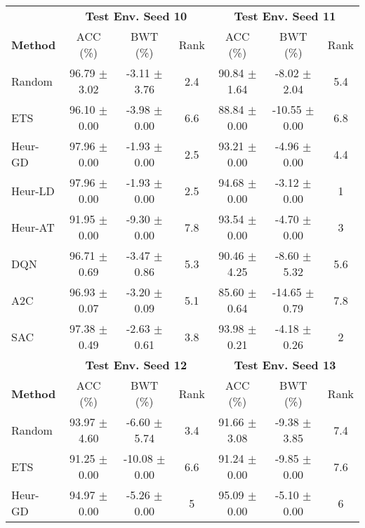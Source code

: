 \begin{tabular}{lcccccc}
	\toprule 
	& \multicolumn{3}{c}{\textbf{Test Env. Seed 10}} & \multicolumn{3}{c}{\textbf{Test Env. Seed 11}} \\
	\cmidrule(lr){2-4} \cmidrule(lr){5-7}
	\textbf{Method} & ACC (\%)          & BWT (\%)          & Rank   & ACC (\%)          & BWT (\%)          & Rank   \\
	\midrule 
	Random          & 96.79 $\pm$ 3.02    & -3.11 $\pm$ 3.76    & 2.4    & 90.84 $\pm$ 1.64    & -8.02 $\pm$ 2.04    & 5.4    \\
	ETS             & 96.10 $\pm$ 0.00    & -3.98 $\pm$ 0.00    & 6.6    & 88.84 $\pm$ 0.00    & -10.55 $\pm$ 0.00   & 6.8    \\
	Heur-GD         & 97.96 $\pm$ 0.00    & -1.93 $\pm$ 0.00    & 2.5    & 93.21 $\pm$ 0.00    & -4.96 $\pm$ 0.00    & 4.4    \\
	Heur-LD         & 97.96 $\pm$ 0.00    & -1.93 $\pm$ 0.00    & 2.5    & 94.68 $\pm$ 0.00    & -3.12 $\pm$ 0.00    & 1      \\
	Heur-AT         & 91.95 $\pm$ 0.00    & -9.30 $\pm$ 0.00    & 7.8    & 93.54 $\pm$ 0.00    & -4.70 $\pm$ 0.00    & 3      \\
	DQN             & 96.71 $\pm$ 0.69    & -3.47 $\pm$ 0.86    & 5.3    & 90.46 $\pm$ 4.25    & -8.60 $\pm$ 5.32    & 5.6    \\
	A2C             & 96.93 $\pm$ 0.07    & -3.20 $\pm$ 0.09    & 5.1    & 85.60 $\pm$ 0.64    & -14.65 $\pm$ 0.79   & 7.8    \\
	SAC             & 97.38 $\pm$ 0.49    & -2.63 $\pm$ 0.61    & 3.8    & 93.98 $\pm$ 0.21    & -4.18 $\pm$ 0.26    & 2      \\
	\midrule 
	& \multicolumn{3}{c}{\textbf{Test Env. Seed 12}} & \multicolumn{3}{c}{\textbf{Test Env. Seed 13}} \\
	\cmidrule(lr){2-4} \cmidrule(lr){5-7}
	\textbf{Method} & ACC (\%)          & BWT (\%)          & Rank   & ACC (\%)          & BWT (\%)          & Rank   \\
	\midrule 
	Random          & 93.97 $\pm$ 4.60    & -6.60 $\pm$ 5.74    & 3.4    & 91.66 $\pm$ 3.08    & -9.38 $\pm$ 3.85    & 7.4    \\
	ETS             & 91.25 $\pm$ 0.00    & -10.08 $\pm$ 0.00   & 6.6    & 91.24 $\pm$ 0.00    & -9.85 $\pm$ 0.00    & 7.6    \\
	Heur-GD         & 94.97 $\pm$ 0.00    & -5.26 $\pm$ 0.00    & 5      & 95.09 $\pm$ 0.00    & -5.10 $\pm$ 0.00    & 6      \\

\end{tabular}
